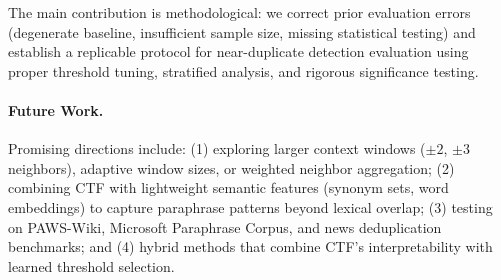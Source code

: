 \documentclass[11pt,letterpaper]{article}
\begin{document}
The main contribution is methodological: we correct prior evaluation errors (degenerate baseline, insufficient sample size, missing statistical testing) and establish a replicable protocol for near-duplicate detection evaluation using proper threshold tuning, stratified analysis, and rigorous significance testing.

\paragraph{Future Work.}
Promising directions include: (1) exploring larger context windows ($\pm2$, $\pm3$ neighbors), adaptive window sizes, or weighted neighbor aggregation; (2) combining CTF with lightweight semantic features (synonym sets, word embeddings) to capture paraphrase patterns beyond lexical overlap; (3) testing on PAWS-Wiki, Microsoft Paraphrase Corpus, and news deduplication benchmarks; and (4) hybrid methods that combine CTF's interpretability with learned threshold selection.



\end{document}
